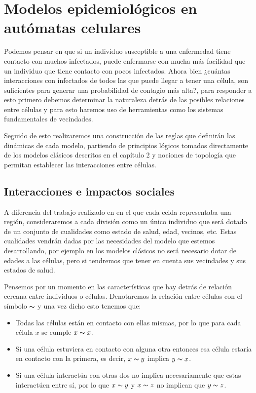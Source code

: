 \chapter{Modelos epidemiológicos en autómatas celulares}\label{ch:Modelos epidemiológicos en AC}

Podemos pensar en que si un individuo susceptible a una enfermedad tiene contacto con muchos infectados, puede enfermarse con mucha más facilidad que un individuo que tiene contacto con pocos infectados. Ahora bien ¿cuántas interacciones con infectados de todos las que puede llegar a tener una célula, son suficientes para generar una probabilidad de contagio más alta?, para responder a esto primero debemos determinar la naturaleza detrás de las posibles relaciones entre células y para esto haremos uso de herramientas como los sistemas fundamentales de vecindades.

Seguido de esto realizaremos una construcción de las reglas que definirán las dinámicas de cada modelo, partiendo de principios lógicos tomados directamente de los modelos clásicos descritos en el capítulo 2 y nociones de topología que permitan establecer las interacciones entre células.

\section{Interacciones e impactos sociales}
A diferencia del trabajo realizado en \cite{populationDensity} en el que cada celda representaba una región, consideraremos a cada división como un único individuo que será dotado de un conjunto de cualidades como estado de salud, edad, vecinos, etc. Estas cualidades vendrán dadas por las necesidades del modelo que estemos desarrollando, por ejemplo en los modelos clásicos no será necesario dotar de edades a las células, pero si tendremos que tener en cuenta sus vecindades y sus estados de salud.

Pensemos por un momento en las características que hay detrás de relación cercana entre individuos o células. Denotaremos la relación entre células con el símbolo $\thicksim$ y una vez dicho esto tenemos que:

\begin{itemize}
    \item Todas las células están en contacto con ellas mismas, por lo que para cada célula $x$ se cumple $x \thicksim x$.
    \item Si una célula estuviera en contacto con alguna otra entonces esa célula estaría en contacto con la primera, es decir, $x\thicksim y$ implica $y\thicksim x$.
    \item Si una célula interactúa con otras dos no implica necesariamente que estas interactúen entre sí, por lo que $x\thicksim y$ y $x\thicksim z$ no implican que $y\thicksim z$.
\end{itemize}

